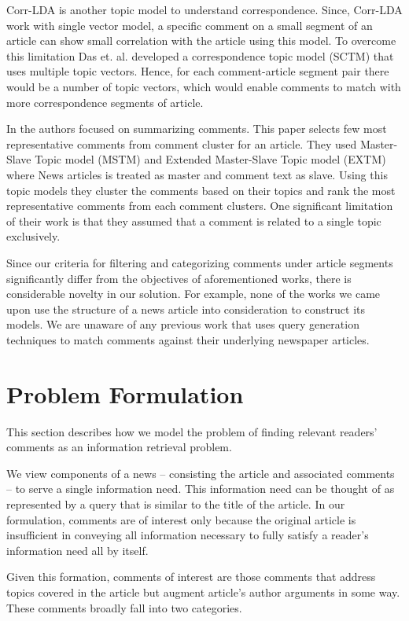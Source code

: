 \documentclass[article]{IEEEtran}
\begin{document}
Corr-LDA \cite{Titov:2008:MOR:1367497.1367513} is another topic model to understand correspondence. Since, Corr-LDA work with single vector model, a specific comment on a small segment of an article can show small correlation with the article using this model. To overcome this limitation Das et. al. \cite{Das:2014:GBC:2556195.2556231} developed a correspondence topic model (SCTM) that uses multiple topic vectors. Hence, for each comment-article segment pair there would be a number of topic vectors, which would enable comments to match with more correspondence segments of article. 

In \cite{Ma:2012:TRC:2396761.2396798} the authors focused on summarizing comments. This paper selects few most representative comments from comment cluster for an article. They used Master-Slave Topic model (MSTM) and Extended Master-Slave Topic model (EXTM) where News articles is treated as master and comment text as slave. Using this topic models they cluster the comments based on their topics and rank the most representative comments from each comment clusters. One significant limitation of their work is that they assumed that a comment is related to a single topic exclusively. 

Since our criteria for filtering and categorizing comments under article segments significantly differ from the objectives of aforementioned works, there is considerable novelty in our solution. For example, none of the works we came upon use the structure of a news article into consideration to construct its models. We are unaware of any previous work that uses query generation techniques to match comments against their underlying newspaper articles.       

\section{Problem Formulation}
\label{pf}
This section describes how we model the problem of finding relevant readers' comments as an information retrieval problem.

We view components of a news -- consisting the article and associated comments --  to serve a single information need. This information need can be thought of as represented by a query that is similar to the title of the article. In our formulation, comments are of interest only because the original article is insufficient in conveying all information necessary to fully satisfy a reader's information need all by itself. 

Given this formation, comments of interest are those comments that address topics covered in the article but augment article's author arguments in some way. These comments broadly fall into two categories.  
\end{document}
